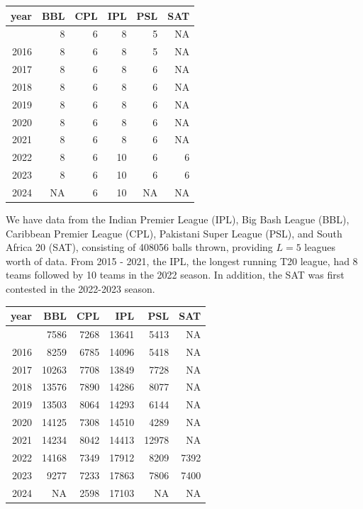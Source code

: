 \documentclass[
  12pt,
]{article}
\begin{document}
\begin{longtable}[]{@{}rrrrrr@{}}
\toprule\noalign{}
year & BBL & CPL & IPL & PSL & SAT \\
\midrule\noalign{}
\endhead
\bottomrule\noalign{}
\endlastfoot
2015 & 8 & 6 & 8 & 5 & NA \\
2016 & 8 & 6 & 8 & 5 & NA \\
2017 & 8 & 6 & 8 & 6 & NA \\
2018 & 8 & 6 & 8 & 6 & NA \\
2019 & 8 & 6 & 8 & 6 & NA \\
2020 & 8 & 6 & 8 & 6 & NA \\
2021 & 8 & 6 & 8 & 6 & NA \\
2022 & 8 & 6 & 10 & 6 & 6 \\
2023 & 8 & 6 & 10 & 6 & 6 \\
2024 & NA & 6 & 10 & NA & NA \\
\end{longtable}

We have data from the Indian Premier League (IPL), Big Bash League
(BBL), Caribbean Premier League (CPL), Pakistani Super League (PSL), and
South Africa 20 (SAT), consisting of 408056 balls thrown, providing
\(L = 5\) leagues worth of data. From 2015 - 2021, the IPL, the longest
running T20 league, had 8 teams followed by 10 teams in the 2022 season.
In addition, the SAT was first contested in the 2022-2023 season.

\begin{longtable}[]{@{}rrrrrr@{}}
\toprule\noalign{}
year & BBL & CPL & IPL & PSL & SAT \\
\midrule\noalign{}
\endhead
\bottomrule\noalign{}
\endlastfoot
2015 & 7586 & 7268 & 13641 & 5413 & NA \\
2016 & 8259 & 6785 & 14096 & 5418 & NA \\
2017 & 10263 & 7708 & 13849 & 7728 & NA \\
2018 & 13576 & 7890 & 14286 & 8077 & NA \\
2019 & 13503 & 8064 & 14293 & 6144 & NA \\
2020 & 14125 & 7308 & 14510 & 4289 & NA \\
2021 & 14234 & 8042 & 14413 & 12978 & NA \\
2022 & 14168 & 7349 & 17912 & 8209 & 7392 \\
2023 & 9277 & 7233 & 17863 & 7806 & 7400 \\
2024 & NA & 2598 & 17103 & NA & NA \\
\end{longtable}
\end{document}
